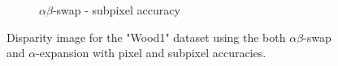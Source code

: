 \documentclass[letterpaper, 10 pt, conference]{ieeeconf}  %
\begin{document}
\begin{figure}[t]
\begin{subfigure}[b]{0.3\textwidth}
                \caption{$\alpha\beta$-swap - subpixel accuracy}
                \label{fig:farm}
        \end{subfigure}
        \caption{Disparity image for the "Wood1" dataset using the both $\alpha\beta$-swap and $\alpha$-expansion with pixel and subpixel accuracies.}
        \label{fig:realmaps}
\end{figure}


 

\end{document}
